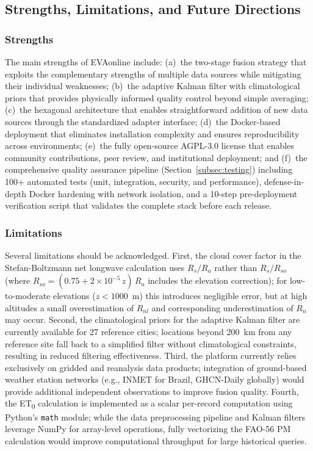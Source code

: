 \documentclass[preprint,review,12pt]{elsarticle}
\begin{document}
\subsection{Strengths, Limitations, and Future Directions}
\label{subsec:limitations}

\subsubsection*{Strengths}

The main strengths of EVAonline include: (a)~the two-stage fusion strategy
that exploits the complementary strengths of multiple data sources while
mitigating their individual weaknesses; (b)~the adaptive Kalman filter with
climatological priors that provides physically informed quality control beyond
simple averaging; (c)~the hexagonal architecture that enables straightforward
addition of new data sources through the standardized adapter interface;
(d)~the Docker-based deployment that eliminates installation complexity and
ensures reproducibility across environments; (e)~the fully open-source
AGPL-3.0 license that enables community contributions, peer review, and
institutional deployment; and (f)~the comprehensive quality assurance pipeline
(Section~\ref{subsec:testing}) including 100+ automated tests (unit,
integration, security, and performance), defense-in-depth Docker hardening
with network isolation, and a 10-step pre-deployment verification script that
validates the complete stack before each release.

\subsubsection*{Limitations}

Several limitations should be acknowledged. First, the cloud cover factor
in the Stefan-Boltzmann net longwave calculation uses $R_s/R_a$ rather
than $R_s/R_{so}$ (where $R_{so} = (0.75 + 2 \times 10^{-5}\,z)\,R_a$
includes the elevation correction); for low-to-moderate elevations
($z < 1000$~m) this introduces negligible error, but at high altitudes
a small overestimation of $R_{nl}$ and corresponding underestimation of
$R_n$ may occur. Second, the
climatological priors for the adaptive Kalman filter are currently available for
27 reference cities; locations beyond 200~km from any reference site fall back
to a simplified filter without climatological constraints, resulting in reduced
filtering effectiveness. Third, the platform currently relies exclusively on
gridded and reanalysis data products; integration of ground-based weather
station networks (e.g., INMET for Brazil, GHCN-Daily globally) would provide
additional independent observations to improve fusion quality. Fourth, the
ET\textsubscript{0} calculation is implemented as a scalar per-record
computation using Python's \texttt{math} module; while the data preprocessing
pipeline and Kalman filters leverage NumPy for array-level operations, fully
vectorizing the FAO-56 PM calculation would improve computational throughput
for large historical queries.
\end{document}
